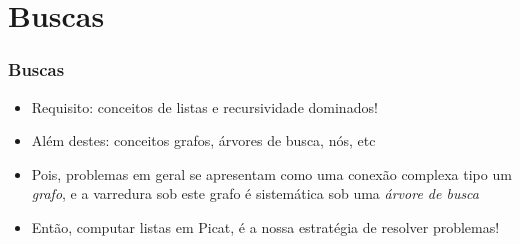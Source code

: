 
\section{Buscas}
\begin{frame}

    \frametitle{Buscas}

   \begin{block}{}
     \begin{itemize}
      \item Requisito: conceitos de listas e recursividade  dominados!
       \pause
      \item Além destes: conceitos grafos, árvores de busca, nós, etc
         
       \pause
      \item Pois, problemas em geral
      se apresentam como uma conexão complexa tipo um \textit{grafo},
      e a varredura sob este grafo é sistemática
      sob uma \textit{árvore de busca}
      \pause
      
     \item Então, computar listas em Picat, é a nossa estratégia
     de resolver problemas!

    \end{itemize}
    
    \end{block}
    
\end{frame}




